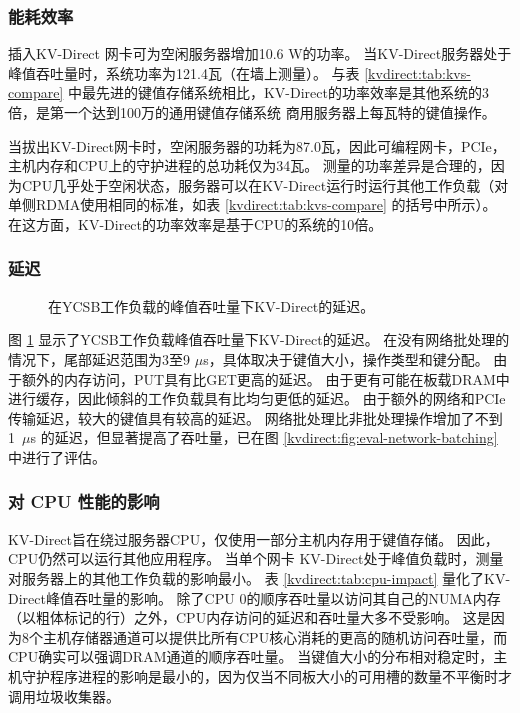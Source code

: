 \subsubsection{能耗效率}

插入KV-Direct 网卡可为空闲服务器增加10.6 W的功率。
当KV-Direct服务器处于峰值吞吐量时，系统功率为121.4瓦（在墙上测量）。
与表 \ref {kvdirect:tab:kvs-compare} 中最先进的键值存储系统相比，KV-Direct的功率效率是其他系统的3倍，是第一个达到100万的通用键值存储系统 商用服务器上每瓦特的键值操作。

当拔出KV-Direct网卡时，空闲服务器的功耗为87.0瓦，因此可编程网卡，PCIe，主机内存和CPU上的守护进程的总功耗仅为34瓦。
测量的功率差异是合理的，因为CPU几乎处于空闲状态，服务器可以在KV-Direct运行时运行其他工作负载（对单侧RDMA使用相同的标准，如表 \ref{kvdirect:tab:kvs-compare} 的括号中所示）。
在这方面，KV-Direct的功率效率是基于CPU的系统的10倍。

\subsubsection{延迟}
\begin{figure}[t]
\centering
{}
\caption{在YCSB工作负载的峰值吞吐量下KV-Direct的延迟。}
\label{kvdirect:fig:ycsb-lat}

\end{figure}

图 \ref {kvdirect:fig:ycsb-lat} 显示了YCSB工作负载峰值吞吐量下KV-Direct的延迟。
在没有网络批处理的情况下，尾部延迟范围为3至9 $\mu$s，具体取决于键值大小，操作类型和键分配。
由于额外的内存访问，PUT具有比GET更高的延迟。
由于更有可能在板载DRAM中进行缓存，因此倾斜的工作负载具有比均匀更低的延迟。
由于额外的网络和PCIe传输延迟，较大的键值具有较高的延迟。
网络批处理比非批处理操作增加了不到1~$\mu$s 的延迟，但显著提高了吞吐量，已在图 \ref {kvdirect:fig:eval-network-batching} 中进行了评估。

\subsubsection{对 CPU 性能的影响}


KV-Direct旨在绕过服务器CPU，仅使用一部分主机内存用于键值存储。 因此，CPU仍然可以运行其他应用程序。
当单个网卡 KV-Direct处于峰值负载时，测量对服务器上的其他工作负载的影响最小。
表 \ref {kvdirect:tab:cpu-impact} 量化了KV-Direct峰值吞吐量的影响。
除了CPU 0的顺序吞吐量以访问其自己的NUMA内存（以粗体标记的行）之外，CPU内存访问的延迟和吞吐量大多不受影响。
这是因为8个主机存储器通道可以提供比所有CPU核心消耗的更高的随机访问吞吐量，而CPU确实可以强调DRAM通道的顺序吞吐量。
当键值大小的分布相对稳定时，主机守护程序进程的影响是最小的，因为仅当不同板大小的可用槽的数量不平衡时才调用垃圾收集器。

